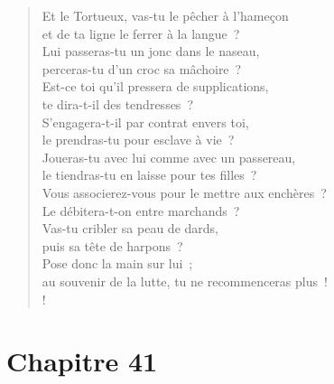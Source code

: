 \documentclass[french,twoside]{book} %
\newcommand\chapteropen{} %
\newcommand\chaptercont{} %
\newcommand\chapterclose{} %
\begin{document}
\begin{verse}
Et le Tortueux, vas-tu le pêcher à l’hameçon \\
et de ta ligne le ferrer à la langue ?\\
Lui passeras-tu un jonc dans le naseau, \\
perceras-tu d’un croc sa mâchoire ?\\
Est-ce toi qu’il pressera de supplications, \\
te dira-t-il des tendresses ?\\
S’engagera-t-il par contrat envers toi, \\
le prendras-tu pour esclave à vie ?\\
Joueras-tu avec lui comme avec un passereau, \\
le tiendras-tu en laisse pour tes filles ?\\
Vous associerez-vous pour le mettre aux enchères ? \\
Le débitera-t-on entre marchands ?\\
Vas-tu cribler sa peau de dards, \\
puis sa tête de harpons ?\\
Pose donc la main sur lui ; \\
au souvenir de la lutte, tu ne recommenceras plus !\\!
\end{verse}
\chapterclose


\chapteropen
\chapter[{Chapitre 41}]{Chapitre 41}\renewcommand{\leftmark}{Chapitre 41}


\chaptercont
\end{document}
